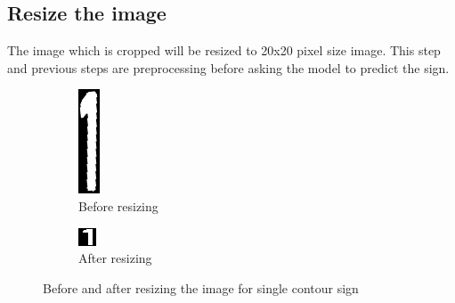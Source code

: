 \subsection{Resize the image}
The image which is cropped will be resized to 20x20 pixel size image. This step and previous steps are preprocessing before asking the model to predict the sign.
\begin{figure}[h!]
\begin{subfigure}{0.5\textwidth}
\centering
\includegraphics[scale=1]{images/AfterCropping.png} 
\caption{Before resizing}
\end{subfigure}
\begin{subfigure}{0.5\textwidth}
\vspace{2.2cm}
\centering
\includegraphics[scale=1]{images/AfterResizing.png} 
\caption{After resizing}
\end{subfigure}
\caption{Before and after resizing the image for single contour sign}
\label{fig:BeforeAfterResizeSingleContour}
\end{figure}

